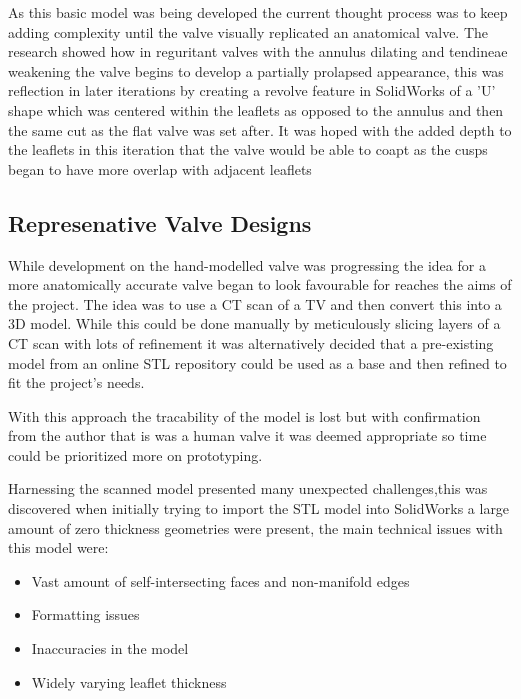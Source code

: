 \mynewline
{}
As this basic model was being developed the current thought process was to keep adding complexity until the valve visually replicated an anatomical valve.
The research  showed how in reguritant valves with the annulus dilating and tendineae weakening the valve begins to develop a partially prolapsed appearance, this was reflection in later iterations by creating a revolve feature in SolidWorks of a 'U' shape which was centered within the leaflets as opposed to the annulus and then the same cut as the flat valve was set after.
It was hoped with the added depth to the leaflets in this iteration that the valve would be able to coapt as the cusps began to have more overlap with adjacent leaflets

\subsection{Represenative Valve Designs}

While development on the hand-modelled valve was progressing the idea for a more anatomically accurate valve began to look favourable for reaches the aims of the project. The idea was to use a \gls{CT} scan of a \gls{TV} and then convert this into a 3D model. While this could be done manually by meticulously slicing layers of a \gls{CT} scan with lots of refinement it was alternatively decided that a pre-existing model from an online STL repository could be used as a base and then refined to fit the project's needs.

With this approach the tracability of the model is lost but with confirmation from the author that is was a human valve it was deemed appropriate so time could be prioritized more on prototyping.

Harnessing the scanned model presented many unexpected challenges,this was discovered when initially trying to import the STL model into SolidWorks a large amount of zero thickness geometries were present, the main technical issues with this model were:
\begin{itemize}
  \item Vast amount of self-intersecting faces and non-manifold edges
  \item Formatting issues
  \item Inaccuracies in the model
  \item Widely varying leaflet thickness
\end{itemize}

